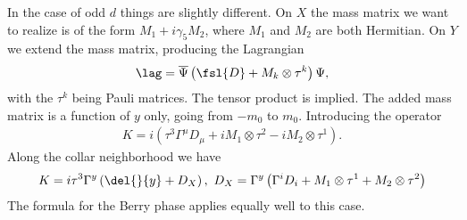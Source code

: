 In the case of odd $d$ things are slightly different. On $X$ the mass matrix we want to realize is of the form $M_{1} + i\gamma_{5}M_{2}$, where $M_{1}$ and $M_{2}$ are both Hermitian. On $Y$ we extend the mass matrix, producing the Lagrangian
\begin{align*}
	\lag = \overline{\Psi}\left(\fsl{D} + M_{k}\otimes\tau^{k}\right)\Psi,
\end{align*}
with the $\tau^{k}$ being Pauli matrices. The tensor product is implied. The added mass matrix is a function of $y$ only, going from $-m_{0}$ to $m_{0}$. Introducing the operator
\begin{align*}
	K = i\left(\tau^{3}\Gamma^{\mu}D_{\mu} + iM_{1}\otimes\tau^{2} - iM_{2}\otimes\tau^{1}\right).
\end{align*}
Along the collar neighborhood we have
\begin{align*}
	K = i\tau^{3}\Gamma^{y}\left(\del{}{y} + D_{X}\right),\ D_{X} = \Gamma^{y}\left(\Gamma^{i}D_{i} + M_{1}\otimes\tau^{1} + M_{2}\otimes\tau^{2}\right)
\end{align*}
The formula for the Berry phase applies equally well to this case.

